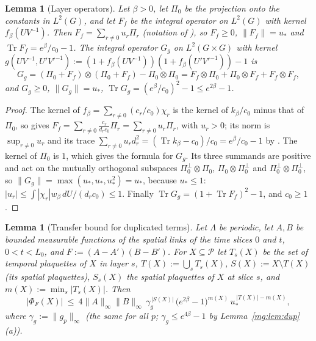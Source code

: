 \documentclass[11pt,a4paper]{article}
\newtheorem{lemma}[theorem]{Lemma}
\theoremstyle{definition}
\theoremstyle{remark}
\DeclareMathOperator{\Tr}{Tr}
\newcommand{\cP}{\mathcal{P}}
\newcommand{\dU}{\,dU}
\newcommand{\norm}[1]{\lVert #1\rVert}
\newcommand{\Fref}[3]{\cite[#1~`#2' (\texttt{#3})]{F}}
\newcommand{\Flab}[2]{\cite[#1 \texttt{#2}]{F}}
\begin{document}
\begin{lemma}[Layer operators]\label{mg:lem:layerop}
Let $\beta>0$, let $\Pi_0$ be the projection onto the constants in $L^2(G)$, and let $F_f$ be the integral operator on $L^2(G)$ with kernel
$f_\beta(UV^{-1})$. Then $F_f=\sum_{r\neq0}u_r\Pi_r$ (notation of \Fref{Lemma}{The one-link operator}{lem:kop}), so $F_f\ge0$,
$\norm{F_f}=u_*$ and $\Tr F_f=e^\beta/c_0-1$. The integral operator $G_g$ on $L^2(G\times G)$ with kernel
$g(UV^{-1},U'V'^{-1}):=(1+f_\beta(UV^{-1}))(1+f_\beta(U'V'^{-1}))-1$ is
\[
G_g=(\Pi_0+F_f)\otimes(\Pi_0+F_f)-\Pi_0\otimes\Pi_0=F_f\otimes\Pi_0+\Pi_0\otimes F_f+F_f\otimes F_f ,
\]
and $G_g\ge0$, $\norm{G_g}=u_*$, $\Tr G_g=(e^\beta/c_0)^2-1\le e^{2\beta}-1$.
\end{lemma}

\begin{proof}
The kernel of $f_\beta=\sum_{r\neq0}(c_r/c_0)\chi_r$ is the kernel of $k_\beta/c_0$ minus that of $\Pi_0$, so \Flab{Lemma}{lem:kop} gives
$F_f=\sum_{r\neq0}\frac{c_r}{d_rc_0}\Pi_r=\sum_{r\ne0}u_r\Pi_r$, with $u_r>0$; its norm is $\sup_{r\ne0}u_r$ and its trace
$\sum_{r\neq0}u_rd_r^2=(\Tr k_\beta-c_0)/c_0=e^\beta/c_0-1$ by \Flab{eq.}{eq:trace}. The kernel of $\Pi_0$ is $1$, which gives the formula for
$G_g$. Its three summands are positive and act on the mutually orthogonal subspaces $\Pi_0^\perp\otimes\Pi_0$, $\Pi_0\otimes\Pi_0^\perp$ and
$\Pi_0^\perp\otimes\Pi_0^\perp$, so $\norm{G_g}=\max(u_*,u_*,u_*^2)=u_*$, because $u_*\le1$: $|u_r|\le\int|\chi_r|w_\beta\dU/(d_rc_0)\le1$. Finally
$\Tr G_g=(1+\Tr F_f)^2-1$, and $c_0\ge1$.
\end{proof}

\begin{lemma}[Transfer bound for duplicated terms]\label{mg:lem:transfer}
Let $\Lambda$ be periodic, let $A,B$ be bounded measurable functions of the spatial links of the time
slices $0$ and $t$, $0<t<L_0$, and $F:=(A-A')(B-B')$. For $X\subseteq\cP$ let $T_s(X)$ be the set of temporal plaquettes of $X$ in layer $s$,
$T(X):=\bigcup_sT_s(X)$, $S(X):=X\setminus T(X)$ (its spatial plaquettes), $S_s(X)$ the spatial plaquettes of $X$ at slice $s$, and
$m(X):=\min_s|T_s(X)|$. Then
\[
|\Phi_F(X)|\ \le\ 4\norm A_\infty\norm B_\infty\,\gamma_g^{\,|S(X)|}\,\bigl(e^{2\beta}-1\bigr)^{m(X)}\,u_*^{\,|T(X)|-m(X)} ,
\]
where $\gamma_g:=\norm{g_p}_\infty$ (the same for all $p$; $\gamma_g\le e^{4\beta}-1$ by Lemma~\ref{mg:lem:dup}(a)).
\end{lemma}
\end{document}
